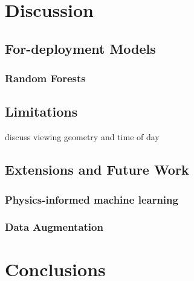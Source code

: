 \documentclass[remotesensing,article,submit,pdftex,moreauthors]{Definitions/mdpi}
\begin{document}
\section{Discussion}
\subsection{For-deployment Models}
\subsubsection{Random Forests}


\subsection{Limitations}
discuss viewing geometry and time of day

\subsection{Extensions and Future Work}
\subsubsection{Physics-informed machine learning}
\subsubsection{Data Augmentation}

\section{Conclusions}


\vspace{6pt} 


\end{document}
